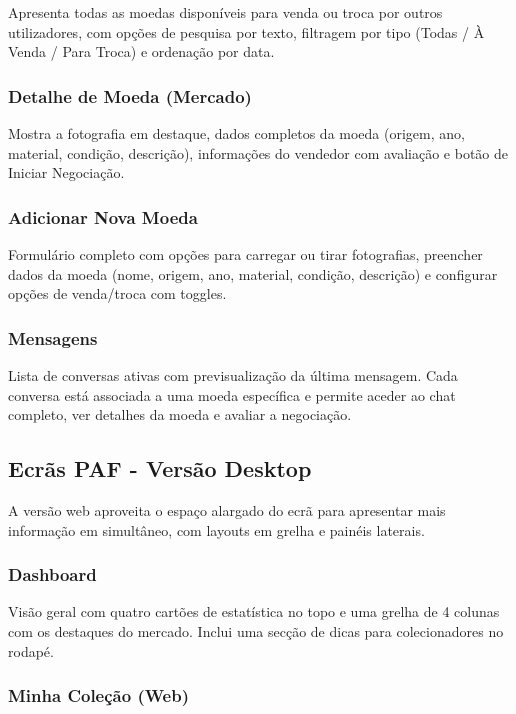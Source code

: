 \documentclass[12pt,a4paper]{article}
\begin{document}
Apresenta todas as moedas disponíveis para venda ou troca por outros utilizadores, com opções de pesquisa por texto, filtragem por tipo (Todas / À Venda / Para Troca) e ordenação por data.

\subsubsection{Detalhe de Moeda (Mercado)}

Mostra a fotografia em destaque, dados completos da moeda (origem, ano, material, condição, descrição), informações do vendedor com avaliação e botão de Iniciar Negociação.

\subsubsection{Adicionar Nova Moeda}

Formulário completo com opções para carregar ou tirar fotografias, preencher dados da moeda (nome, origem, ano, material, condição, descrição) e configurar opções de venda/troca com toggles.

\subsubsection{Mensagens}

Lista de conversas ativas com previsualização da última mensagem. Cada conversa está associada a uma moeda específica e permite aceder ao chat completo, ver detalhes da moeda e avaliar a negociação.

\subsection{Ecrãs PAF - Versão Desktop}

A versão web aproveita o espaço alargado do ecrã para apresentar mais informação em simultâneo, com layouts em grelha e painéis laterais.

\subsubsection{Dashboard}

Visão geral com quatro cartões de estatística no topo e uma grelha de 4 colunas com os destaques do mercado. Inclui uma secção de dicas para colecionadores no rodapé.

\subsubsection{Minha Coleção (Web)}
\end{document}

